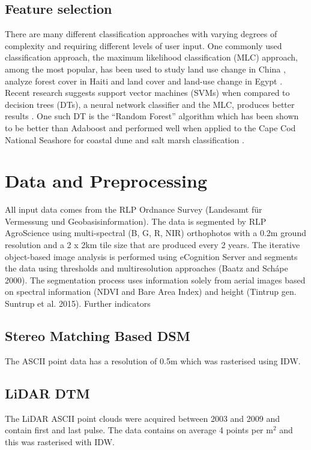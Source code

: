 \documentclass[authoryear, review,12pt,number]{elsarticle}
\begin{document}
\subsection{Feature selection}
There are many different classification approaches with varying degrees of
complexity and requiring different levels of user input. One commonly used
classification approach, the maximum likelihood classification (MLC) approach,
among the most popular, has been used to study land use change in China
\citep{Ding2007}, analyze forest cover in Haiti \citep{Churches2014} and land
cover and land-use change in Egypt \citep{Shalaby2007}. Recent research suggests
support vector machines (SVMs) when compared to decision trees (DTs), a neural
network classifier and the MLC, produces better results \citep{Huang2002}. One
such DT is the ``Random Forest'' algorithm which has been shown to be better
than Adaboost \citep{Chan2008} and performed well when applied to the Cape Cod
National Seashore for coastal dune and salt marsh classification
\citep{Timm2012}.
\section{Data and Preprocessing}
All input data comes from the RLP Ordnance Survey (Landesamt f\"ur Vermessung und
Geobasisinformation).
The data is segmented by RLP AgroScience using
multi-spectral (B, G, R, NIR) orthophotos with a 0.2m ground resolution and a
2 x 2km tile size that are produced every 2 years. The iterative object-based
image analysis is performed using eCognition Server and segments
the data using thresholds and multiresolution approaches (Baatz and
Sch\'ape 2000). The segmentation process uses information solely from aerial
images based on spectral information (NDVI and Bare Area Index) and height
(Tintrup gen. Suntrup et al. 2015). Further indicators 

\subsection{Stereo Matching Based DSM}
The ASCII point data has a resolution of 0.5m which was rasterised using IDW.
\subsection{LiDAR DTM}
The LiDAR ASCII point clouds were acquired between 2003 and 2009 and contain
first and last pulse. The data contains on average 4 points per m$^{2}$ and
this was rasterised with IDW.
\end{document}
